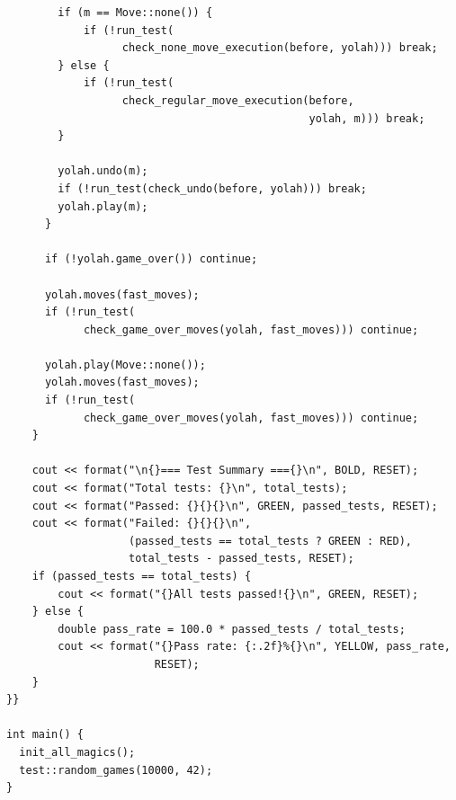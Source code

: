 \documentclass[12pt,a4paper,twoside,openright]{book}
\begin{document}
\begin{mdframed}[skipabove=\baselineskip,topline=false,rightline=false,bottomline=false,leftline=false,linewidth=1pt,linecolor=gray!40,innerleftmargin=8pt]
\begin{verbatim}
        if (m == Move::none()) {
            if (!run_test(
                  check_none_move_execution(before, yolah))) break;
        } else {
            if (!run_test(
                  check_regular_move_execution(before, 
                                               yolah, m))) break;
        }

        yolah.undo(m);
        if (!run_test(check_undo(before, yolah))) break;
        yolah.play(m);
      }

      if (!yolah.game_over()) continue;

      yolah.moves(fast_moves);
      if (!run_test(
            check_game_over_moves(yolah, fast_moves))) continue;

      yolah.play(Move::none());
      yolah.moves(fast_moves);
      if (!run_test(
            check_game_over_moves(yolah, fast_moves))) continue;
    }

    cout << format("\n{}=== Test Summary ==={}\n", BOLD, RESET);
    cout << format("Total tests: {}\n", total_tests);
    cout << format("Passed: {}{}{}\n", GREEN, passed_tests, RESET);
    cout << format("Failed: {}{}{}\n", 
                   (passed_tests == total_tests ? GREEN : RED), 
                   total_tests - passed_tests, RESET);
    if (passed_tests == total_tests) {
        cout << format("{}All tests passed!{}\n", GREEN, RESET);
    } else {
        double pass_rate = 100.0 * passed_tests / total_tests;
        cout << format("{}Pass rate: {:.2f}%{}\n", YELLOW, pass_rate, 
                       RESET);
    }
}}

int main() {
  init_all_magics();
  test::random_games(10000, 42);
}
\end{verbatim}
\label{lst:random_games_property_based_testing}
\end{mdframed}
\end{document}
